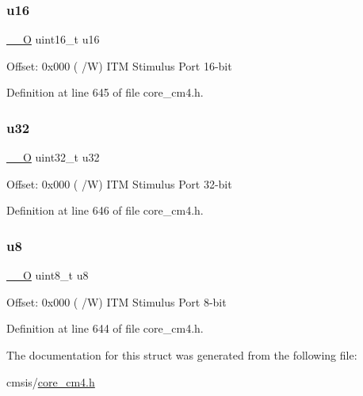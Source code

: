 \subsubsection{\texorpdfstring{u16}{u16}}
{\footnotesize\ttfamily \hyperlink{group___c_m_s_i_s__core__definitions_ga7e25d9380f9ef903923964322e71f2f6}{\+\_\+\+\_\+O} uint16\+\_\+t u16}

Offset\+: 0x000 ( /W) I\+TM Stimulus Port 16-\/bit 

Definition at line 645 of file core\+\_\+cm4.\+h.

\mbox{\label{struct_i_t_m___type_acaf6d0e14a3d4b541c624913b4a1931e}} 
\subsubsection{\texorpdfstring{u32}{u32}}
{\footnotesize\ttfamily \hyperlink{group___c_m_s_i_s__core__definitions_ga7e25d9380f9ef903923964322e71f2f6}{\+\_\+\+\_\+O} uint32\+\_\+t u32}

Offset\+: 0x000 ( /W) I\+TM Stimulus Port 32-\/bit 

Definition at line 646 of file core\+\_\+cm4.\+h.

\mbox{\label{struct_i_t_m___type_a0374c0b98ab9de6f71fabff7412df832}} 
\subsubsection{\texorpdfstring{u8}{u8}}
{\footnotesize\ttfamily \hyperlink{group___c_m_s_i_s__core__definitions_ga7e25d9380f9ef903923964322e71f2f6}{\+\_\+\+\_\+O} uint8\+\_\+t u8}

Offset\+: 0x000 ( /W) I\+TM Stimulus Port 8-\/bit 

Definition at line 644 of file core\+\_\+cm4.\+h.



The documentation for this struct was generated from the following file\+:\begin{DoxyCompactItemize}
\item 
cmsis/\hyperlink{core__cm4_8h}{core\+\_\+cm4.\+h}\end{DoxyCompactItemize}
